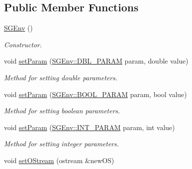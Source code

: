 \subsection*{Public Member Functions}
\begin{DoxyCompactItemize}
\item 
\hyperlink{classSGEnv_ac7fe265f0baba4e498c36bd67a0bbc97}{S\-G\-Env} ()
\begin{DoxyCompactList}\small\item\em Constructor. \end{DoxyCompactList}\item 
\hypertarget{classSGEnv_a6edf7d4d2cdba8cba621420ff09d98ea}{void \hyperlink{classSGEnv_a6edf7d4d2cdba8cba621420ff09d98ea}{set\-Param} (\hyperlink{classSGEnv_add4d052ff3e3d09a2113e0ebd032eba3}{S\-G\-Env\-::\-D\-B\-L\-\_\-\-P\-A\-R\-A\-M} param, double value)}\label{classSGEnv_a6edf7d4d2cdba8cba621420ff09d98ea}

\begin{DoxyCompactList}\small\item\em Method for setting double parameters. \end{DoxyCompactList}\item 
\hypertarget{classSGEnv_ac4a7fe04e3b253e073160feaf172ae00}{void \hyperlink{classSGEnv_ac4a7fe04e3b253e073160feaf172ae00}{set\-Param} (\hyperlink{classSGEnv_acff56acdb55b7734c7bc63c5ddf6af90}{S\-G\-Env\-::\-B\-O\-O\-L\-\_\-\-P\-A\-R\-A\-M} param, bool value)}\label{classSGEnv_ac4a7fe04e3b253e073160feaf172ae00}

\begin{DoxyCompactList}\small\item\em Method for setting boolean parameters. \end{DoxyCompactList}\item 
\hypertarget{classSGEnv_a613eb2cdb45deb914cfcfc5c33d9f9a6}{void \hyperlink{classSGEnv_a613eb2cdb45deb914cfcfc5c33d9f9a6}{set\-Param} (\hyperlink{classSGEnv_ad42a8834fadc101c871bd724ca028fad}{S\-G\-Env\-::\-I\-N\-T\-\_\-\-P\-A\-R\-A\-M} param, int value)}\label{classSGEnv_a613eb2cdb45deb914cfcfc5c33d9f9a6}

\begin{DoxyCompactList}\small\item\em Method for setting integer parameters. \end{DoxyCompactList}\item 
\hypertarget{classSGEnv_a30c578e700ba7e656646168c646dadf9}{void \hyperlink{classSGEnv_a30c578e700ba7e656646168c646dadf9}{set\-O\-Stream} (ostream \&new\-O\-S)}\label{classSGEnv_a30c578e700ba7e656646168c646dadf9}


\end{DoxyCompactItemize}
